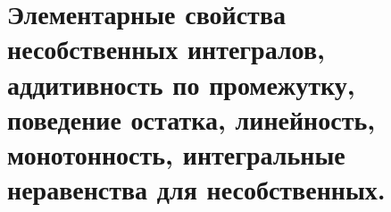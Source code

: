 \documentclass[../main.tex]{subfiles}
\begin{document}
\newpage
\section{Элементарные свойства несобственных интегралов, аддитивность по промежутку, поведение остатка, линейность, монотонность, интегральные неравенства для несобственных.}
\end{document}
